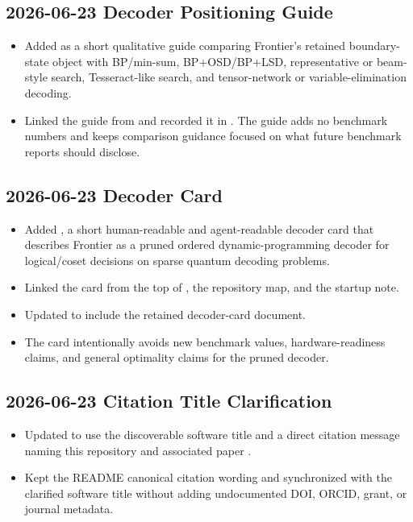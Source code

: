 \subsection*{2026-06-23 Decoder Positioning Guide}

\begin{itemize}
\item Added \texttt{} as a short qualitative guide comparing Frontier's retained boundary-state object with BP/min-sum, BP+OSD/BP+LSD, representative or beam-style search, Tesseract-like search, and tensor-network or variable-elimination decoding.
\item Linked the guide from \texttt{} and recorded it in \texttt{}. The guide adds no benchmark numbers and keeps comparison guidance focused on what future benchmark reports should disclose.
\end{itemize}

\subsection*{2026-06-23 Decoder Card}

\begin{itemize}
\item Added \texttt{}, a short human-readable and agent-readable decoder card that describes Frontier as a pruned ordered dynamic-programming decoder for logical/coset decisions on sparse quantum decoding problems.
\item Linked the card from the top of \texttt{}, the repository map, and the \texttt{} startup note.
\item Updated \texttt{} to include the retained decoder-card document.
\item The card intentionally avoids new benchmark values, hardware-readiness claims, and general optimality claims for the pruned decoder.
\end{itemize}

\subsection*{2026-06-23 Citation Title Clarification}

\begin{itemize}
\item Updated \texttt{} to use the discoverable software title \texttt{} and a direct citation message naming this repository and associated paper \texttt{}.
\item Kept the README canonical citation wording and \texttt{} synchronized with the clarified software title without adding undocumented DOI, ORCID, grant, or journal metadata.
\end{itemize}

